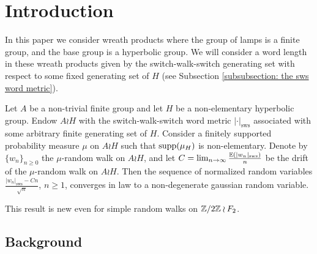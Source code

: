 \section{Introduction}
In this paper we consider wreath products where the group of lamps is a finite group, and the base group is a hyperbolic group. We will consider a word length in these wreath products given by the switch-walk-switch generating set with respect to some fixed generating set of $H$ (see Subsection \ref{subsubsection: the sws word metric}).

\begin{thm}\label{thm: main theorem CLT for word length for lamplighter over a hyperbolic base group}
	Let $A$ be a non-trivial finite group and let $H$ be a non-elementary hyperbolic group. Endow $A\wr H$ with the switch-walk-switch word metric $|\cdot|_{\mathrm{sws}}$ associated with some arbitrary finite generating set of $H$. Consider a finitely supported probability measure $\mu$ on $A\wr H$ such that $\mathrm{supp}(\mu_H)$ is non-elementary. Denote by $\{w_n\}_{n\ge 0}$ the $\mu$-random walk on $A\wr H$, and let $C=\lim_{n\to \infty}\frac{\mathbb{E}(|w_n|_{\mathrm{sws}})}{n}$ be the drift of the $\mu$-random walk on $A\wr H$. Then the sequence of normalized random variables $\frac{|w_n|_{\mathrm{sws}}-Cn}{\sqrt{n}}$, $n\ge 1$, converges in law to a non-degenerate gaussian random variable.
\end{thm}
This result is new even for simple random walks on $\mathbb{Z}/2\mathbb{Z}\wr F_2$.


\subsection{Background}

